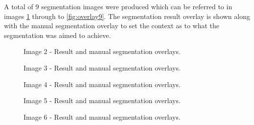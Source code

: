 A total of 9 segmentation images  were produced which can be referred to in images \ref{fig:overlay2} through to \ref{fig:overlay9}. The segmentation result overlay is shown along with the manual segmentation overlay to set the context as to what the segmentation was aimed to achieve.

\begin{figure}[H]
    \centering
    \quad
    \caption{Image 2 - Result and manual segmentation overlays.}%
    \label{fig:overlay2}
\end{figure}

\begin{figure}[H]
    \centering
    \quad
    \caption{Image 3 - Result and manual segmentation overlays.}%
    \label{fig:overlay3}
\end{figure}
 
 \begin{figure}[H]
    \centering
    \quad
    \caption{Image 4 - Result and manual segmentation overlays.}%
    \label{fig:overlay4}
\end{figure}

\begin{figure}[H]
    \centering
    \quad
    \caption{Image 5 - Result and manual segmentation overlays.}%
    \label{fig:overlay5}
\end{figure}

\begin{figure}[H]
    \centering
    \quad
    \caption{Image 6 - Result and manual segmentation overlays.}%
    \label{fig:overlay6}
\end{figure}
 
